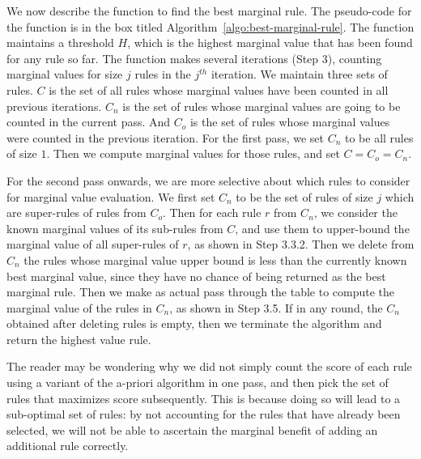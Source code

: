 \documentclass[10pt,journal,compsoc]{IEEEtran}
\newcommand{\papertext}[1]{}
\newcommand{\techreporttext}[1]{#1}
\begin{document}
We now describe the function to find the best marginal rule. \papertext{The pesudo-code for the function is in the technical report}\techreporttext{The pseudo-code for the function is in the box titled Algorithm~\ref{algo:best-marginal-rule}}. The function maintains a threshold $H$, which is the highest marginal value that has been found for any rule so far. The function makes several iterations (Step $3$), counting marginal values for size $j$ rules in the $j^{th}$ iteration. We maintain three sets of rules. $C$ is the set of all rules whose marginal values have been counted in all previous iterations. $C_n$ is the set of rules whose marginal values are going to be counted in the current pass. And $C_o$ is the set of rules whose marginal values were counted in the previous iteration. For the first pass, we set $C_n$ to be all rules of size $1$. Then we compute marginal values for those rules, and set $C = C_o = C_n$.

For the second pass onwards, we are more selective about which rules to consider for marginal value evaluation. We first set $C_n$ to be the set of rules of size $j$ which are super-rules of rules from $C_o$. Then for each rule $r$ from $C_n$, we consider the known marginal values of its sub-rules from $C$, and use them to upper-bound the marginal value of all super-rules of $r$, as shown in Step 3.3.2. Then we delete from $C_n$ the rules whose marginal value upper bound is less than the currently known best marginal value, since they have no chance of being returned as the best marginal rule. Then we make as actual pass through the table to compute the marginal value of the rules in $C_n$, as shown in Step 3.5. If in any round, the $C_n$ obtained after deleting rules is empty, then we terminate the algorithm and return the highest value rule. 

The reader may be wondering why we did not simply count the score of each rule using a variant of the a-priori algorithm in one pass, and then pick the set of rules that maximizes score subsequently. This is because doing so will lead to a sub-optimal set of rules: by not accounting for the rules that have already been selected, we will not be able to ascertain the marginal benefit of adding an additional rule correctly.
\end{document}
